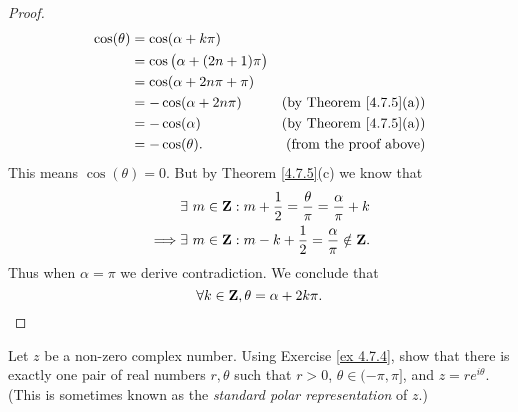 \begin{proof}
    \begin{align*}
        \cos(\theta) & = \cos(\alpha + k \pi)                                                     \\
                     & = \cos\big(\alpha + (2n + 1) \pi\big)                                      \\
                     & = \cos(\alpha + 2 n \pi + \pi)                                             \\
                     & = -\cos(\alpha + 2 n \pi)             & \text{(by Theorem \ref{4.7.5}(a))} \\
                     & = -\cos(\alpha)                       & \text{(by Theorem \ref{4.7.5}(a))} \\
                     & = -\cos(\theta).                      & \text{(from the proof above)}
    \end{align*}
    This means \(\cos(\theta) = 0\).
    But by Theorem \ref{4.7.5}(c) we know that
    \begin{align*}
                 & \exists\ m \in \mathbf{Z} : m + \frac{1}{2} = \frac{\theta}{\pi} = \frac{\alpha}{\pi} + k \\
        \implies & \exists\ m \in \mathbf{Z} : m - k + \frac{1}{2} = \frac{\alpha}{\pi} \notin \mathbf{Z}.
    \end{align*}
    Thus when \(\alpha = \pi\) we derive contradiction.
    We conclude that
    \[
        \forall k \in \mathbf{Z}, \theta = \alpha + 2 k \pi.
    \]
\end{proof}

\begin{exercise}\label{ex 4.7.6}
    Let \(z\) be a non-zero complex number.
    Using Exercise \ref{ex 4.7.4}, show that there is exactly one pair of real numbers \(r, \theta\) such that \(r > 0\), \(\theta \in (-\pi, \pi]\), and \(z = r e^{i \theta}\).
    (This is sometimes known as the \emph{standard polar representation} of \(z\).)
\end{exercise}

